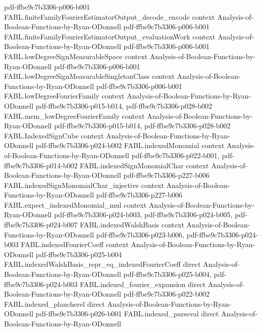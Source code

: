 \begin{theorem}
  {pdf-ffbe9c7b3306-p006-b001}
\proofstep
  {FABL.finiteFamilyFourierEstimatorOutput_decode_encode}
  {context}
  {Analysis-of-Boolean-Functions-by-Ryan-ODonnell}
  {pdf-ffbe9c7b3306-p006-b001}
\proofstep
  {FABL.finiteFamilyFourierEstimatorOutput_evaluationWork}
  {context}
  {Analysis-of-Boolean-Functions-by-Ryan-ODonnell}
  {pdf-ffbe9c7b3306-p006-b001}
\proofstep
  {FABL.lowDegreeSignMeasurableSpace}
  {context}
  {Analysis-of-Boolean-Functions-by-Ryan-ODonnell}
  {pdf-ffbe9c7b3306-p006-b001}
\proofstep
  {FABL.lowDegreeSignMeasurableSingletonClass}
  {context}
  {Analysis-of-Boolean-Functions-by-Ryan-ODonnell}
  {pdf-ffbe9c7b3306-p006-b001}
\proofstep
  {FABL.lowDegreeFourierFamily}
  {context}
  {Analysis-of-Boolean-Functions-by-Ryan-ODonnell}
  {pdf-ffbe9c7b3306-p015-b014,
    pdf-ffbe9c7b3306-p028-b002}
\proofstep
  {FABL.mem_lowDegreeFourierFamily}
  {context}
  {Analysis-of-Boolean-Functions-by-Ryan-ODonnell}
  {pdf-ffbe9c7b3306-p015-b014,
    pdf-ffbe9c7b3306-p028-b002}
\proofstep
  {FABL.IndexedSignCube}
  {context}
  {Analysis-of-Boolean-Functions-by-Ryan-ODonnell}
  {pdf-ffbe9c7b3306-p024-b002}
\proofstep
  {FABL.indexedMonomial}
  {context}
  {Analysis-of-Boolean-Functions-by-Ryan-ODonnell}
  {pdf-ffbe9c7b3306-p022-b001,
    pdf-ffbe9c7b3306-p014-b002}
\proofstep
  {FABL.indexedSignMonomialChar}
  {context}
  {Analysis-of-Boolean-Functions-by-Ryan-ODonnell}
  {pdf-ffbe9c7b3306-p227-b006}
\proofstep
  {FABL.indexedSignMonomialChar_injective}
  {context}
  {Analysis-of-Boolean-Functions-by-Ryan-ODonnell}
  {pdf-ffbe9c7b3306-p227-b006}
\proofstep
  {FABL.expect_indexedMonomial_mul}
  {context}
  {Analysis-of-Boolean-Functions-by-Ryan-ODonnell}
  {pdf-ffbe9c7b3306-p024-b003,
    pdf-ffbe9c7b3306-p024-b005,
    pdf-ffbe9c7b3306-p024-b007}
\proofstep
  {FABL.indexedWalshBasis}
  {context}
  {Analysis-of-Boolean-Functions-by-Ryan-ODonnell}
  {pdf-ffbe9c7b3306-p023-b006,
    pdf-ffbe9c7b3306-p024-b003}
\proofstep
  {FABL.indexedFourierCoeff}
  {context}
  {Analysis-of-Boolean-Functions-by-Ryan-ODonnell}
  {pdf-ffbe9c7b3306-p025-b004}
\proofstep
  {FABL.indexedWalshBasis_repr_eq_indexedFourierCoeff}
  {direct}
  {Analysis-of-Boolean-Functions-by-Ryan-ODonnell}
  {pdf-ffbe9c7b3306-p025-b004,
    pdf-ffbe9c7b3306-p024-b003}
\proofstep
  {FABL.indexed_fourier_expansion}
  {direct}
  {Analysis-of-Boolean-Functions-by-Ryan-ODonnell}
  {pdf-ffbe9c7b3306-p022-b002}
\proofstep
  {FABL.indexed_plancherel}
  {direct}
  {Analysis-of-Boolean-Functions-by-Ryan-ODonnell}
  {pdf-ffbe9c7b3306-p026-b001}
\proofstep
  {FABL.indexed_parseval}
  {direct}
  {Analysis-of-Boolean-Functions-by-Ryan-ODonnell}

\end{theorem}
